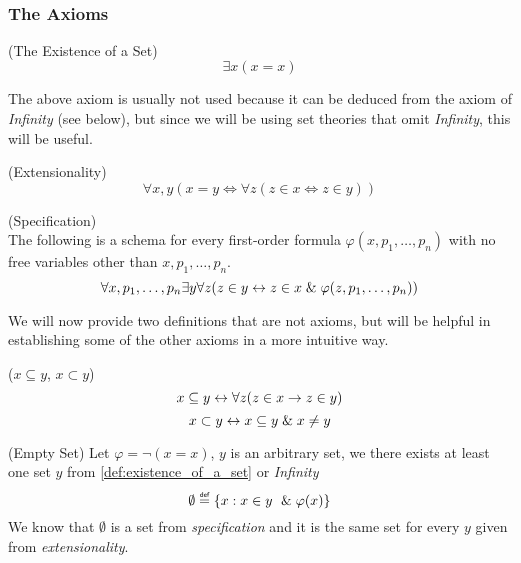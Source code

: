 \


\subsubsection{The Axioms}

\begin{definition}{(The Existence of a Set)}\label{def:existence_of_a_set}
\begin{equation}
\exists x (x = x)
\end{equation}
\end{definition}
The above axiom is usually not used because it can be deduced from the axiom of \emph{Infinity} (see below), but since we will be using set theories that omit \emph{Infinity}, this will be useful.

\begin{definition}{(Extensionality)}\label{def:extensionality}
\begin{equation}
\forall x, y (x = y \iff \forall z (z \in x \iff z \in y)) %
\end{equation}
\end{definition}

\begin{definition}{(Specification)}\label{def:specification}\\
The following is a schema for every first-order formula $\varphi(x, p_1, \ldots, p_n)$ with no free variables other than $x, p_1, \ldots, p_n$.
\begin{equation}
\forall x, p_1, \ldots, p_n \exists y \forall z ( z \in y \iff z \in x \et \varphi(z, p_1, \ldots, p_n)) %
\end{equation}
\end{definition}

We will now provide two definitions that are not axioms, but will be helpful in establishing some of the other axioms in a more intuitive way.
\begin{definition}{($x \subseteq y$, $x \subset y$)}
\begin{equation}
x \subseteq y \leftrightarrow \forall z(z \in x \rightarrow z \in y)
\end{equation}
\begin{equation}
x \subset y \leftrightarrow x \subseteq y \mathrel{\&} x \neq y
\end{equation}
\end{definition}

\begin{definition}{(Empty Set)}\label{def:emptyset}
Let $\varphi = \neg(x = x)$, $y$ is an arbitrary set, we there exists at least one set $y$ from \ref{def:existence_of_a_set} or \emph{Infinity}
\begin{equation}
\emptyset \defeq \{x : x \in y\ \et \varphi(x)\}
\end{equation}
We know that $\emptyset$ is a set from \emph{specification} and it is the same set for every $y$ given from \emph{extensionality}.
\end{definition}


